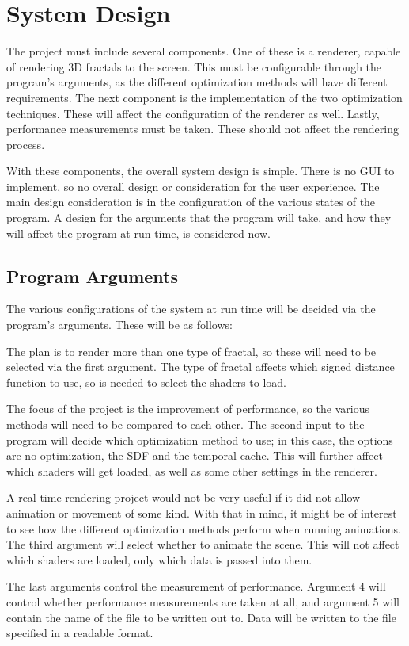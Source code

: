 \section{System Design}

The project must include several components. One of these is a renderer, capable of rendering 3D fractals to the screen. This must be configurable through the program's arguments, as the different optimization methods will have different requirements. The next component is the implementation of the two optimization techniques. These will affect the configuration of the renderer as well. Lastly, performance measurements must be taken. These should not affect the rendering process.\newline

With these components, the overall system design is simple. There is no GUI to implement, so no overall design or consideration for the user experience. The main design consideration is in the configuration of the various states of the program. A design for the arguments that the program will take, and how they will affect the program at run time, is considered now.

\subsection{Program Arguments}

The various configurations of the system at run time will be decided via the program's arguments. These will be as follows:\newline

The plan is to render more than one type of fractal, so these will need to be selected via the first argument. The type of fractal affects which signed distance function to use, so is needed to select the shaders to load.\newline

The focus of the project is the improvement of performance, so the various methods will need to be compared to each other. The second input to the program will decide which optimization method to use; in this case, the options are no optimization, the SDF and the temporal cache. This will further affect which shaders will get loaded, as well as some other settings in the renderer.\newline

A real time rendering project would not be very useful if it did not allow animation or movement of some kind. With that in mind, it might be of interest to see how the different optimization methods perform when running animations. The third argument will select whether to animate the scene. This will not affect which shaders are loaded, only which data is passed into them.\newline

The last arguments control the measurement of performance. Argument 4 will control whether performance measurements are taken at all, and argument 5 will contain the name of the file to be written out to. Data will be written to the file specified in a readable format.